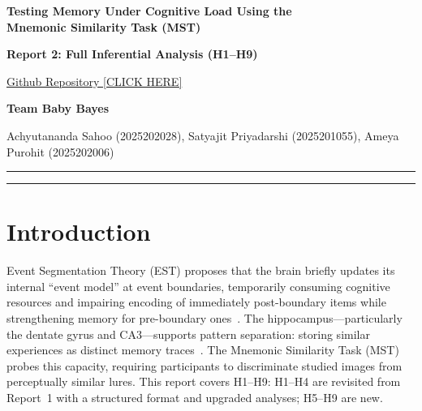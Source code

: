 \documentclass[10pt,a4paper]{article}
\begin{document}
\begin{center}
{\LARGE\bfseries Testing Memory Under Cognitive Load Using the\\[4pt]
Mnemonic Similarity Task (MST)\par}
\vspace{0.3cm}
{\large\bfseries Report 2: Full Inferential Analysis (H1--H9)\par}
\vspace{0.25cm}
{\normalsize\href{https://github.com/team-baby-bayes/mst-study}{Github Repository [CLICK HERE]}\par}
\vspace{0.25cm}
{\normalsize\textbf{Team Baby Bayes}\par}
\vspace{0.15cm}
{\normalsize
Achyutananda Sahoo (2025202028),\quad
Satyajit Priyadarshi (2025201055),\quad
Ameya Purohit (2025202006)\par}
\end{center}

\noindent\rule{\textwidth}{0.4pt}

\begin{abstract}
\noindent
This report presents the complete inferential analysis (H1--H9) for an MST study on how cognitive load at event boundaries affects recognition memory (REC) and lure discrimination (LDI). Report~2 revisits H1--H4 with corrected hypotheses and upgraded tests, and introduces five new analyses. All groups exceed chance on REC and LDI (H1--H2 supported). Boundary position does not affect LDI (H3 not supported) but does affect REC with a condition interaction (H7 partially supported). A lure-similarity gradient confirms pattern separation (H4 supported). Condition modulates LDI but not REC (H6 partially supported). A large boundary slowdown in encoding RT is found ($\eta^2_p{=}0.335$, H8 supported), with no speed--accuracy trade-off (H9 not supported).
\end{abstract}

\noindent\rule{\textwidth}{0.4pt}

\section{Introduction}

Event Segmentation Theory (EST) proposes that the brain briefly updates its internal ``event model'' at event boundaries, temporarily consuming cognitive resources and impairing encoding of immediately post-boundary items while strengthening memory for pre-boundary ones~\cite{zacks2007}. The hippocampus---particularly the dentate gyrus and CA3---supports pattern separation: storing similar experiences as distinct memory traces~\cite{bakker2008}. The Mnemonic Similarity Task (MST) probes this capacity, requiring participants to discriminate studied images from perceptually similar lures. This report covers H1--H9: H1--H4 are revisited from Report~1 with a structured format and upgraded analyses; H5--H9 are new.
\end{document}
